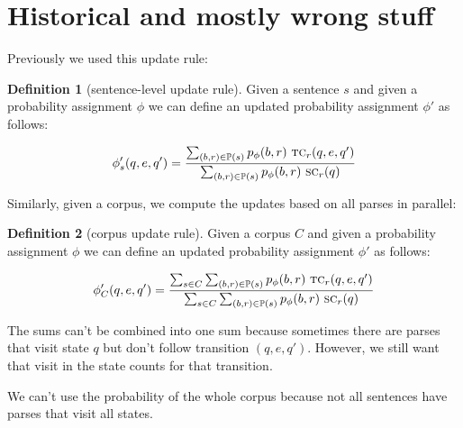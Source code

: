 \documentclass[12pt]{article}
\theoremstyle{definition}
\newtheorem{definition}{Definition}[section]
\begin{document}
\section{Historical and mostly wrong stuff}




Previously we used this update rule:

\begin{definition}[sentence-level update rule]
  Given a sentence $s$ and given a probability assignment $\phi$ we can define an updated probability assignment $\phi'$ as follows:

  $$\phi_s'(q,e,q') = \frac{\sum_{(b,r)\in\mathbb{P}(s)}p_\phi(b,r)~\text{\textsc{tc}}_r(q,e,q')}{\sum_{(b,r)\in\mathbb{P}(s)}p_\phi(b,r)~\text{\textsc{sc}}_r(q)}$$
\end{definition}

%




Similarly, given a corpus, we compute the updates based on all parses in parallel:
\begin{definition}[corpus update rule]
  Given a corpus $C$ and given a probability assignment $\phi$ we can define an updated probability assignment $\phi'$ as follows:

 $$\phi_C'(q,e,q') = \frac{\sum_{s\in C}\sum_{(b,r)\in\mathbb{P}(s)} p_\phi(b,r)~ \text{\textsc{tc}}_r(q,e,q')}{\sum_{s\in C}\sum_{(b,r)\in\mathbb{P}(s)} p_\phi(b,r)~ \text{\textsc{sc}}_r(q)}$$ 
\end{definition}


The sums can't be combined into one sum because sometimes there are parses that visit state $q$ but don't follow transition $(q,e,q')$. However, we still want that visit in the state counts for that transition.

We can't use the probability of the whole corpus because not all sentences have parses that visit all states.
\end{document}
